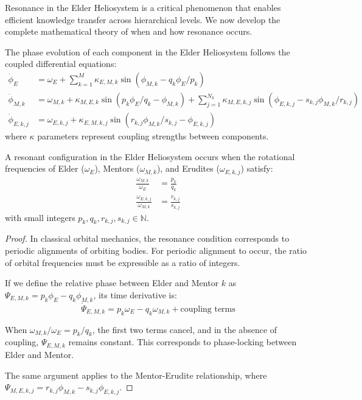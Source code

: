 Resonance in the Elder Heliosystem is a critical phenomenon that enables efficient knowledge transfer across hierarchical levels. We now develop the complete mathematical theory of when and how resonance occurs.

\begin{definition}
The phase evolution of each component in the Elder Heliosystem follows the coupled differential equations:
\begin{align}
\dot{\phi}_E &= \omega_E + \sum_{k=1}^M \kappa_{E,M,k} \sin(\phi_{M,k} - q_k\phi_E/p_k) \\
\dot{\phi}_{M,k} &= \omega_{M,k} + \kappa_{M,E,k} \sin(p_k\phi_E/q_k - \phi_{M,k}) + \sum_{j=1}^{N_k} \kappa_{M,E,k,j} \sin(\phi_{E,k,j} - s_{k,j}\phi_{M,k}/r_{k,j}) \\
\dot{\phi}_{E,k,j} &= \omega_{E,k,j} + \kappa_{E,M,k,j} \sin(r_{k,j}\phi_{M,k}/s_{k,j} - \phi_{E,k,j})
\end{align}
where $\kappa$ parameters represent coupling strengths between components.
\end{definition}

\begin{theorem}
A resonant configuration in the Elder Heliosystem occurs when the rotational frequencies of Elder ($\omega_E$), Mentors ($\omega_{M,k}$), and Erudites ($\omega_{E,k,j}$) satisfy:
\begin{align}
\frac{\omega_{M,k}}{\omega_E} &= \frac{p_k}{q_k} \\
\frac{\omega_{E,k,j}}{\omega_{M,k}} &= \frac{r_{k,j}}{s_{k,j}}
\end{align}
with small integers $p_k, q_k, r_{k,j}, s_{k,j} \in \mathbb{N}$.
\end{theorem}

\begin{proof}
In classical orbital mechanics, the resonance condition corresponds to periodic alignments of orbiting bodies. For periodic alignment to occur, the ratio of orbital frequencies must be expressible as a ratio of integers.

If we define the relative phase between Elder and Mentor $k$ as $\Psi_{E,M,k} = p_k\phi_E - q_k\phi_{M,k}$, its time derivative is:
\begin{equation}
\dot{\Psi}_{E,M,k} = p_k\omega_E - q_k\omega_{M,k} + \text{coupling terms}
\end{equation}

When $\omega_{M,k}/\omega_E = p_k/q_k$, the first two terms cancel, and in the absence of coupling, $\Psi_{E,M,k}$ remains constant. This corresponds to phase-locking between Elder and Mentor.

The same argument applies to the Mentor-Erudite relationship, where $\Psi_{M,E,k,j} = r_{k,j}\phi_{M,k} - s_{k,j}\phi_{E,k,j}$.
\end{proof}

